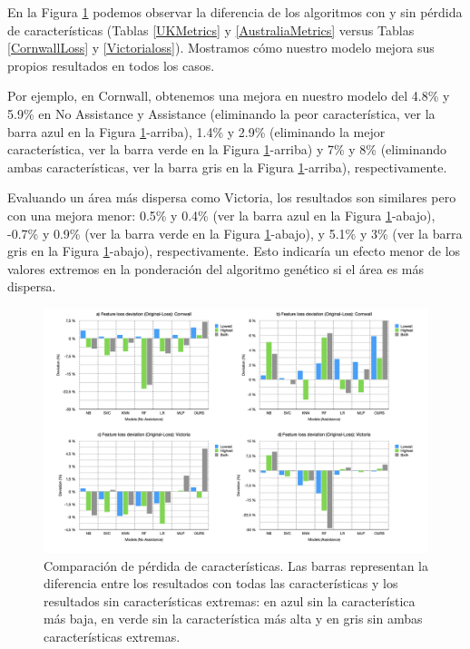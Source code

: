 \documentclass{uathesis-es}
\begin{document}
{En la Figura \ref{lossFig} podemos observar la diferencia de los algoritmos con y sin pérdida de características (Tablas \ref{UKMetrics} y \ref{AustraliaMetrics} versus Tablas \ref{CornwallLoss} y \ref{Victorialoss}). Mostramos cómo nuestro modelo mejora sus propios resultados en todos los casos.

Por ejemplo, en Cornwall, obtenemos una mejora en nuestro modelo del 4.8\% y 5.9\% en No Assistance y Assistance (eliminando la peor característica, ver la barra azul en la Figura \ref{lossFig}-arriba), 1.4\% y 2.9\% (eliminando la mejor característica, ver la barra verde en la Figura \ref{lossFig}-arriba) y 7\% y 8\% (eliminando ambas características, ver la barra gris en la Figura \ref{lossFig}-arriba), respectivamente.

Evaluando un área más dispersa como Victoria, los resultados son similares pero con una mejora menor: 0.5\% y 0.4\% (ver la barra azul en la Figura \ref{lossFig}-abajo), -0.7\% y 0.9\% (ver la barra verde en la Figura \ref{lossFig}-abajo), y 5.1\% y 3\% (ver la barra gris en la Figura \ref{lossFig}-abajo), respectivamente. Esto indicaría un efecto menor de los valores extremos en la ponderación del algoritmo genético si el área es más dispersa.

\begin{figure}[H]
	\centering
	\includegraphics[width=180mm]{Figures/LossFeatures/loss.png}
	\caption{Comparación de pérdida de características. Las barras representan la diferencia entre los resultados con todas las características y los resultados sin características extremas: en azul sin la característica más baja, en verde sin la característica más alta y en gris sin ambas características extremas.}
	\label{lossFig}
\end{figure}


}
\end{document}

